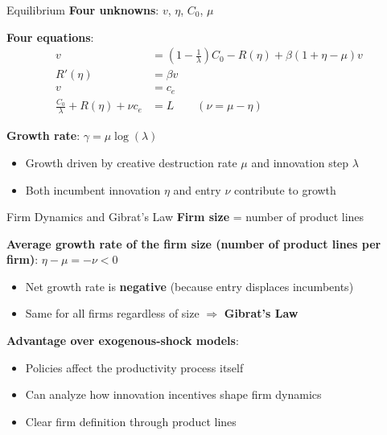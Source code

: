 \documentclass[blue]{beamer}
\begin{document}
\begin{frame}{Equilibrium}
	\textbf{Four unknowns}: $v$, $\eta$, $C_0$, $\mu$
	
	\textbf{Four equations}:
	\begin{align*}
		v &= \left(1 - \frac{1}{\lambda}\right) C_0 - R(\eta) + \beta(1 + \eta - \mu) v \\
		R'(\eta) &= \beta v \\
		v &= c_e \\
		\frac{C_0}{\lambda} + R(\eta) + \nu c_e &= L \qquad (\nu = \mu-\eta)
	\end{align*}
	
	\bigskip
	\textbf{Growth rate}: $\gamma = \mu \log(\lambda)$
	
	\begin{itemize}
		\item Growth driven by creative destruction rate $\mu$ and innovation step $\lambda$
		\item Both incumbent innovation $\eta$ and entry $\nu$ contribute to growth
	\end{itemize}
\end{frame}

\begin{frame}{Firm Dynamics and Gibrat's Law}
	\textbf{Firm size} = number of product lines
	
	\bigskip
	\textbf{Average growth rate of the firm size (number of product lines per firm)}: $\eta - \mu = -\nu < 0$
	\begin{itemize}
		\item Net growth rate is \textbf{negative} (because entry displaces incumbents)
		\item Same for all firms regardless of size $\Rightarrow$ \textbf{Gibrat's Law}
	\end{itemize}
	
	\bigskip
	\textbf{Advantage over exogenous-shock models}:
	\begin{itemize}
		\item Policies affect the productivity process itself
		\item Can analyze how innovation incentives shape firm dynamics
		\item Clear firm definition through product lines
	\end{itemize}
\end{frame}
\end{document}
